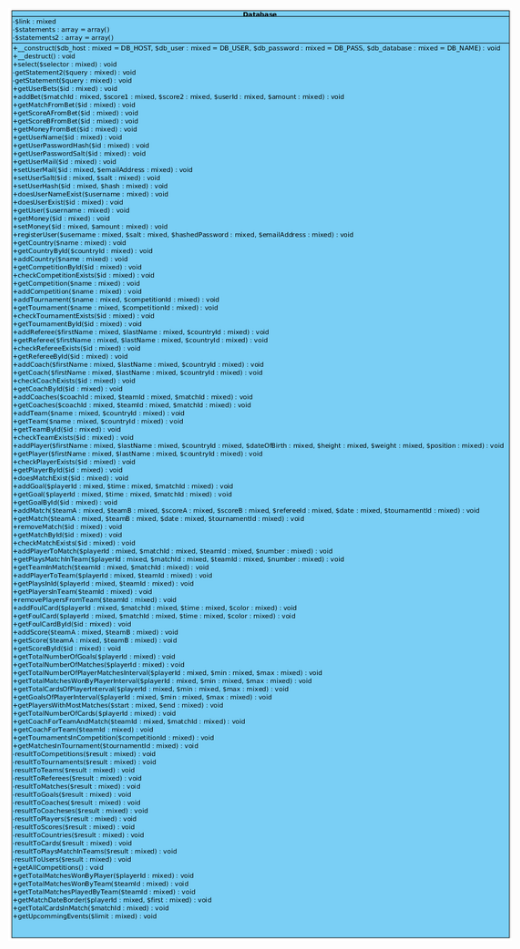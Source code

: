 \documentclass[11pt]{article}
\begin{document}
\includegraphics[scale=0.32]{UML_Database3.png}
\clearpage
\end{document}
